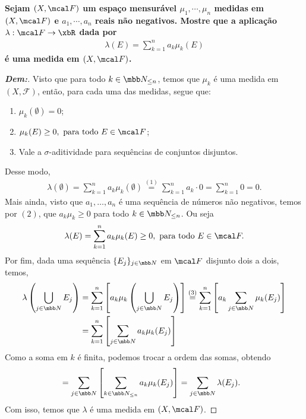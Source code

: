 \newpage
{}
\myexe{\thedois}
\bigline
\textbf{Sejam $(X, \mcal F)$ um espaço mensurável $\mu_1, \cdots, \mu_n$ medidas em 
$(X, \mcal F)$ e $a_1, \cdots, a_n$ reais não negativos. Mostre que a aplicação 
$\lambda: \mcal F \rightarrow \xbR$ dada por 
\begin{align*}
  \lambda(E) = \sum_{k=1}^{n} a_k\mu_k(E)
\end{align*}
é uma medida em $(X, \mcal F)$.}
\begin{proof}[\textbf{Dem:}]
Visto que para todo $k \in \mbb N_{\le n}$, temos que $\mu_k$ é uma medida em $(X, \mathcal F)$,
então, para cada uma das medidas, segue que:
\begin{enumerate}
  \item $\mu_k(\emptyset) = 0$; 
  \item $\mu_k(E) \ge 0, \text{ para todo } E \in \mcal F$; 
  \item Vale a $\sigma$-aditividade para sequências de conjuntos disjuntos.
\end{enumerate}
Desse modo,
\begin{align*}
  \lambda(\emptyset) = \sum_{k=1}^{n} a_k\mu_k(\emptyset) \stackrel{(1)}{=} 
  \sum_{k=1}^{n} a_k \cdot0 = \sum_{k=1}^n 0 = 0. 
\end{align*}
Mais ainda, visto que $a_1, \dots, a_n$ é uma sequência de números não negativos,
  temos por $(2)$, que $a_k \mu_k \ge 0$ para todo $k \in \mbb N_{\le n}$. Ou seja 
\begin{align*}
  \lambda(E) = \sum_{k=1}^n a_k \mu_k(E) \ge 0, \text{ para todo } E \in \mcal F.
\end{align*}
  Por fim, dada uma sequência $\{E_j\}_{j \in \mbb N}$ em $\mcal F$ disjunto dois a dois,
  temos, 
  \begin{align*}
    \lambda\left(\bigcup\limits_{j\in \mbb N} E_j \right) &= 
    \sum_{k=1}^{n} \left[a_k \mu_k\left(\bigcup\limits_{j\in \mbb N} E_j\right)\right]
    \stackrel{(3)}{=}\sum_{k=1}^{n} \left[a_k \sum_{j \in \mbb N}\mu_k(E_j)\right]\\ 
    &= \sum_{k=1}^{n} \left[\sum_{j \in \mbb N}a_k\mu_k(E_j)\right]
    \end{align*}
Como a soma em $k$ é finita, podemos trocar a ordem das somas, obtendo
\begin{align*}
    &= \sum_{j \in \mbb N} \left[\sum_{k \in \mbb N_{\le n}}a_k\mu_k(E_j)\right]
    = \sum_{j \in \mbb N} \lambda(E_j).
  \end{align*}
  Com isso, temos que $\lambda$ é uma medida em $(X, \mcal F)$.
\end{proof}

